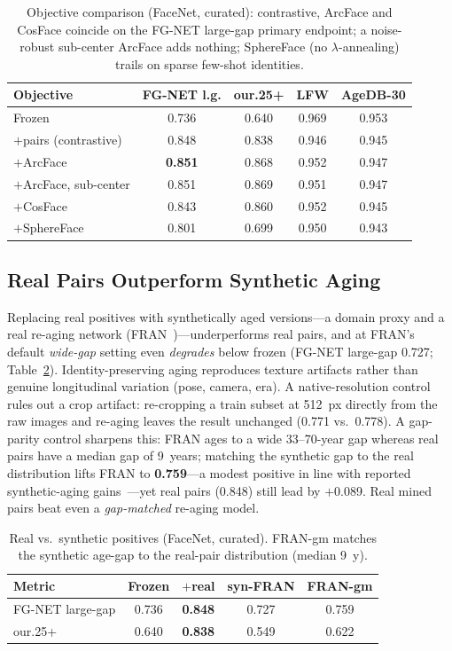\documentclass[letterpaper]{article} %
\begin{document}
\begin{table}[t]
\centering
\setlength{\tabcolsep}{3pt}
\small
\begin{tabular}{@{}lcccc@{}}
\toprule
Objective & FG-NET l.g. & our.25+ & LFW & AgeDB-30 \\
\midrule
Frozen & 0.736 & 0.640 & 0.969 & 0.953 \\
$+$pairs (contrastive) & 0.848 & 0.838 & 0.946 & 0.945 \\
$+$ArcFace & \textbf{0.851} & 0.868 & 0.952 & 0.947 \\
$+$ArcFace, sub-center & 0.851 & 0.869 & 0.951 & 0.947 \\
$+$CosFace & 0.843 & 0.860 & 0.952 & 0.945 \\
$+$SphereFace & 0.801 & 0.699 & 0.950 & 0.943 \\
\bottomrule
\end{tabular}
\caption{Objective comparison (FaceNet, curated): contrastive, ArcFace and CosFace coincide on the FG-NET large-gap primary endpoint; a noise-robust sub-center ArcFace adds nothing; SphereFace (no $\lambda$-annealing) trails on sparse few-shot identities.}
\label{tab:objective}
\end{table}

\subsection{Real Pairs Outperform Synthetic Aging}\label{sec:res-synth}
Replacing real positives with synthetically aged versions---a domain proxy and a real re-aging network (FRAN~\cite{zoss2022fran})---underperforms real pairs, and at FRAN's default \emph{wide-gap} setting even \emph{degrades} below frozen (FG-NET large-gap 0.727; Table~\ref{tab:synth}). Identity-preserving aging reproduces texture artifacts rather than genuine longitudinal variation (pose, camera, era). A native-resolution control rules out a crop artifact: re-cropping a train subset at 512~px directly from the raw images and re-aging leaves the result unchanged (0.771 vs.\ 0.778). A gap-parity control sharpens this: FRAN ages to a wide 33--70-year gap whereas real pairs have a median gap of 9~years; matching the synthetic gap to the real distribution lifts FRAN to \textbf{0.759}---a modest positive in line with reported synthetic-aging gains~\cite{yao2024synthageing}---yet real pairs (0.848) still lead by $+$0.089. Real mined pairs beat even a \emph{gap-matched} re-aging model.

\begin{table}[t]
\centering
\small
\begin{tabular}{@{}lcccc@{}}
\toprule
Metric & Frozen & $+$real & syn-FRAN & FRAN-gm \\
\midrule
FG-NET large-gap & 0.736 & \textbf{0.848} & 0.727 & 0.759 \\
our.25+ & 0.640 & \textbf{0.838} & 0.549 & 0.622 \\
\bottomrule
\end{tabular}
\caption{Real vs.\ synthetic positives (FaceNet, curated). FRAN-gm matches the synthetic age-gap to the real-pair distribution (median 9~y).}
\label{tab:synth}
\end{table}
\end{document}
